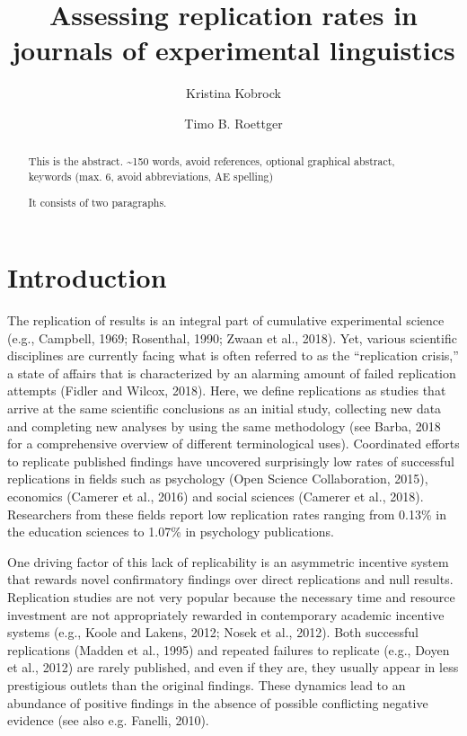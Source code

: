 \documentclass[]{elsarticle} %
\begin{document}
\begin{frontmatter}

  \title{Assessing replication rates in journals of experimental
linguistics}
    \author[University of Osnabrück]{Kristina Kobrock}
    \author[Universitetet i Oslo]{Timo B. Roettger}
  
      \address[University of Osnabrück]{Institute of Cognitive Science,
Wachsbleiche 27, 49090 Osnabrück}
    \address[Universitetet i Oslo]{Department of Linguistics and
Scandinavian Studies}
  
  \begin{abstract}
  This is the abstract. \textasciitilde150 words, avoid references,
  optional graphical abstract, keywords (max. 6, avoid abbreviations, AE
  spelling)

  It consists of two paragraphs.
  \end{abstract}
  
 \end{frontmatter}

\hypertarget{introduction}{%
\section{Introduction}\label{introduction}}

The replication of results is an integral part of cumulative
experimental science (e.g., Campbell, 1969; Rosenthal, 1990; Zwaan et
al., 2018). Yet, various scientific disciplines are currently facing
what is often referred to as the ``replication crisis,'' a state of
affairs that is characterized by an alarming amount of failed
replication attempts (Fidler and Wilcox, 2018). Here, we define
replications as studies that arrive at the same scientific conclusions
as an initial study, collecting new data and completing new analyses by
using the same methodology (see Barba, 2018 for a comprehensive overview
of different terminological uses). Coordinated efforts to replicate
published findings have uncovered surprisingly low rates of successful
replications in fields such as psychology (Open Science Collaboration,
2015), economics (Camerer et al., 2016) and social sciences (Camerer et
al., 2018). Researchers from these fields report low replication rates
ranging from 0.13\% in the education sciences to 1.07\% in psychology
publications.

One driving factor of this lack of replicability is an asymmetric
incentive system that rewards novel confirmatory findings over direct
replications and null results. Replication studies are not very popular
because the necessary time and resource investment are not appropriately
rewarded in contemporary academic incentive systems (e.g., Koole and
Lakens, 2012; Nosek et al., 2012). Both successful replications (Madden
et al., 1995) and repeated failures to replicate (e.g., Doyen et al.,
2012) are rarely published, and even if they are, they usually appear in
less prestigious outlets than the original findings. These dynamics lead
to an abundance of positive findings in the absence of possible
conflicting negative evidence (see also e.g. Fanelli, 2010).
\end{document}
